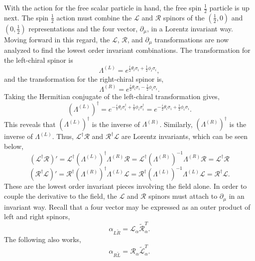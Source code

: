 With the action for the free scalar particle in hand, the free spin $\frac{1}{2}$ particle is up next. The spin $\frac{1}{2}$ action must combine the $\mathcal{L}$ and $\mathcal{R}$ spinors of the $(\frac{1}{2}, 0)$ and $(0, \frac{1}{2})$ representations and the four vector, $\partial_\mu$, in a Lorentz invariant way. Moving forward in this regard, the $\mathcal{L}$, $\mathcal{R}$, and $\partial_\mu$ transformations are now analyzed to find the lowest order invariant combinations. The transformation for the left-chiral spinor is 
\begin{equation}
\Lambda^{(L)} = e^{\frac{i}{2}\theta_i \sigma_i + \frac{1}{2}\phi_i \sigma_i},
\end{equation}
and the transformation for the right-chiral spinor is,
\begin{equation}
\Lambda^{(R)} = e^{\frac{i}{2}\theta_i \sigma_i - \frac{1}{2}\phi_i \sigma_i}.
\end{equation}
Taking the Hermitian conjugate of the left-chiral transformation gives,
\begin{equation}
(\Lambda^{(L)})^\dagger = e^{-\frac{i}{2}\theta_i \sigma_i^\dagger + \frac{1}{2}\phi_i \sigma_i^\dagger} 
= e^{-\frac{i}{2}\theta_i \sigma_i + \frac{1}{2}\phi_i \sigma_i}.
\end{equation}
This reveals that $(\Lambda^{(L)})^\dagger$ is the inverse of $\Lambda^{(R)}$. Similarly, $(\Lambda^{(R)})^\dagger$ is the inverse of $\Lambda^{(L)}$. Thus, $\mathcal{L}^\dagger\mathcal{R}$ and $\mathcal{R}^\dagger\mathcal{L}$ are Lorentz invariants, which can be seen below,
\begin{equation}
(\mathcal{L}^\dagger\mathcal{R})' = \mathcal{L}^\dagger (\Lambda^{(L)})^\dagger \Lambda^{(R)} \mathcal{R} 
= \mathcal{L}^\dagger (\Lambda^{(R)})^{-1} \Lambda^{(R)} \mathcal{R} = \mathcal{L}^\dagger \mathcal{R}  
\end{equation}
\begin{equation}
(\mathcal{R}^\dagger\mathcal{L})' = \mathcal{R}^\dagger (\Lambda^{(R)})^\dagger \Lambda^{(L)} \mathcal{L} 
= \mathcal{R}^\dagger (\Lambda^{(L)})^{-1} \Lambda^{(L)} \mathcal{L} = \mathcal{R}^\dagger \mathcal{L}. 
\end{equation}
These are the lowest order invariant pieces involving the field alone. In order to couple the derivative to the field, the $\mathcal{L}$ and $\mathcal{R}$ spinors must attach to $\partial_\mu$ in an invariant way. Recall that a four vector may be expressed as an outer product of left and right spinors, 
\begin{equation}
\alpha_{L\tilde{R}} = \mathcal{L}_\alpha \tilde{\mathcal{R}}_\alpha^{T}.
\end{equation}
The following also works, 
\begin{equation}
\alpha_{R\tilde{L}} = \mathcal{R}_\alpha \tilde{\mathcal{L}}_\alpha^{T}.
\end{equation}

